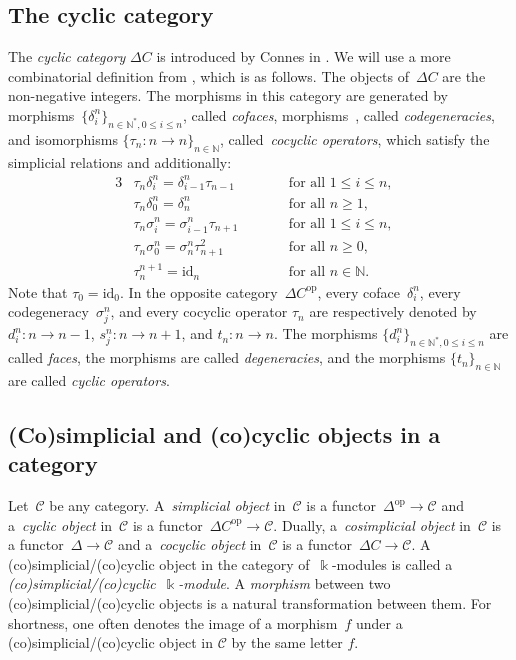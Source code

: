 \documentclass[10pt,a4paper]{amsart}
\numberwithin{equation}{section}
\newcommand{\co}{\colon}
\newcommand{\id}{\mathrm{id}}
\newcommand{\mc}{\mathcal}
\newcommand{\opp}{\mathrm{op}}
\newcommand{\N}{\mathbb{N}}
\newcommand{\kk}{\Bbbk}
\newlength{\gnat}
\begin{document}
\subsection{The cyclic category}
The \emph{cyclic category} $\Delta C$ is introduced by Connes in \cite{Connesext}. We will use a more combinatorial definition from \cite[Section~6.1]{loday98}, which is as follows. The objects of~$\Delta C$ are the non-negative integers.
The morphisms in this category are generated by morphisms~$\{\delta_i^n\}_{n\in \N^*, 0\le i \le n}$, called \textit{cofaces}, morphisms~\smash{$\bigl\{\sigma_j^n\bigr\}_{n\in \N, 0\le j \le n}$}, called \textit{codegeneracies}, and isomorphisms $\{\tau_n\co n \to n\}_{n\in \N}$, called~\emph{cocyclic operators}, which satisfy the simplicial relations and additionally:
\begin{alignat}{3}
\label{compcoccof}
&\tau_n \delta_i^n = \delta_{i-1}^n \tau_{n-1} \qquad&& \text{for all } 1 \leq i \leq n,& \\
\label{tndelta0}
&\tau_n\delta_0^n=\delta_n^n \qquad &&\text{for all } n\ge 1,& \\
\label{compcoccod}
&\tau_n\sigma_i^n=\sigma_{i-1}^n\tau_{n+1} \qquad &&\text{for all } 1 \leq i \leq n,&\\
\label{tnsigma0}
&\tau_n\sigma_0^n=\sigma_n^n\tau_{n+1}^2 \qquad&& \text{for all } n\ge 0,&\\
\label{cocyclicity}
&\tau_n ^{n+1} = \id_{n} \qquad&& \text{for all } n \in \N.&
\end{alignat}
Note that $\tau_0=\id_{0}$.
In the op\-po\-site ca\-te\-go\-ry~$\Delta C^{\opp}$, every co\-face~$\delta_i^n$, every co\-de\-ge\-ne\-ra\-cy~$\sigma_j^n$, and every cocyclic operator $\tau_n$ are re\-spec\-tively de\-noted by $d_i^n \co n \to n-1$, $s_j^n \co n \to n+1$, and $t_n \co n \to n$.
The morphisms $\{d_i^n\}_{n\in \N^*, 0\le i \le n}$ are called \textit{faces}, the morphisms \smash{$\big\{s_j^n\big\}_{n\in \N, 0 \le j \le n}$} are called \textit{degeneracies}, and the morphisms $\{t_n\}_{n\in \N}$ are called \textit{cyclic operators}.



\subsection{(Co)simplicial and (co)cyclic objects in a category} \label{simpcyc}
Let~$\mc C$ be any category.
A~\textit{simplicial object} in~$\mc C$ is a functor~$\Delta^\opp \to \mc C$ and a~\emph{cyclic object} in~$\mc C$ is a functor~$\Delta C^{\opp} \to \mc C$.
Dually, a~\emph{cosimplicial object} in~$\mc{C}$ is a functor~$\Delta \to \mc C$ and a~\emph{cocyclic object} in~$\mc C$ is a functor~$\Delta C \to \mc C$. A (co)simplicial/(co)cyclic object in the category of~$\kk$-modules is called a \textit{(co)simplicial/(co)cyclic~$\kk$-module}.
A \textit{morphism} between two (co)simplicial/(co)cyclic objects is a natu\-ral transformation between them.
For shortness, one often denotes the image of a morphism~$f$ under a (co)simplicial/(co)cyclic object in $\mc C$ by the same letter $f$.
\end{document}
